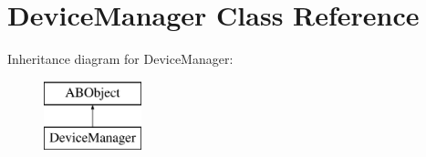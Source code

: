 \hypertarget{class_device_manager}{}\section{Device\+Manager Class Reference}
\label{class_device_manager}
Inheritance diagram for Device\+Manager\+:\begin{figure}[H]
\begin{center}
\leavevmode
\includegraphics[height=2.000000cm]{class_device_manager}
\end{center}
\end{figure}
